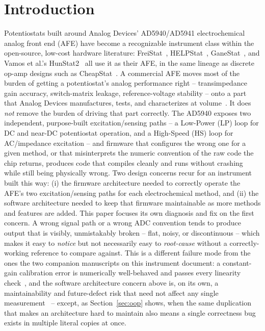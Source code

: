 \section{Introduction}
\label{sec:intro}

Potentiostats built around Analog Devices' AD5940/AD5941 electrochemical
analog front end (AFE) have become a recognizable instrument class within
the open-source, low-cost hardware literature: FreiStat~\cite{bill2023electrochemical},
HELPStat~\cite{bautista2025helpstat}, GaneStat~\cite{anshori2025ganestat},
and Vamos et al.'s HunStat2~\cite{vamos2025hunstat2} all use it as their
AFE, in the same lineage as discrete op-amp designs such as
CheapStat~\cite{rowe2011cheapstat}. A commercial AFE moves most of the
burden of getting a potentiostat's analog performance right -- transimpedance
gain accuracy, switch-matrix leakage, reference-voltage stability -- onto a
part that Analog Devices manufactures, tests, and characterizes at
volume~\cite{devices2024ad5940}. It does \emph{not} remove the burden of
driving that part correctly. The AD5940 exposes two independent,
purpose-built excitation/sensing paths -- a Low-Power (LP) loop for DC and
near-DC potentiostat operation, and a High-Speed (HS) loop for AC/impedance
excitation -- and firmware that configures the wrong one for a given
method, or that misinterprets the numeric convention of the raw code the
chip returns, produces code that compiles cleanly and runs without
crashing while still being physically wrong. Two design concerns recur for
an instrument built this way: (i) the firmware architecture needed to
correctly operate the AFE's two excitation/sensing paths for each
electrochemical method, and (ii) the software architecture needed to keep
that firmware maintainable as more methods and features are added. This
paper focuses its own diagnosis and fix on the first concern. A wrong
signal path or a wrong ADC convention
tends to produce output that is visibly, unmistakably broken -- flat,
noisy, or discontinuous -- which makes it easy to \emph{notice} but not
necessarily easy to \emph{root-cause} without a correctly-working
reference to compare against. This is a different failure mode from the
ones the two companion manuscripts on this instrument document: a
constant-gain calibration error is numerically well-behaved and passes
every linearity check~\cite{clement2026linearity}, and the software
architecture concern above is, on its own, a maintainability and
future-defect risk that need not affect any single
measurement~\cite{clement2026architecture} -- except, as
Section~\ref{sec:oop} shows, when the same duplication that makes an
architecture hard to maintain also means a single correctness bug exists
in multiple literal copies at once.

